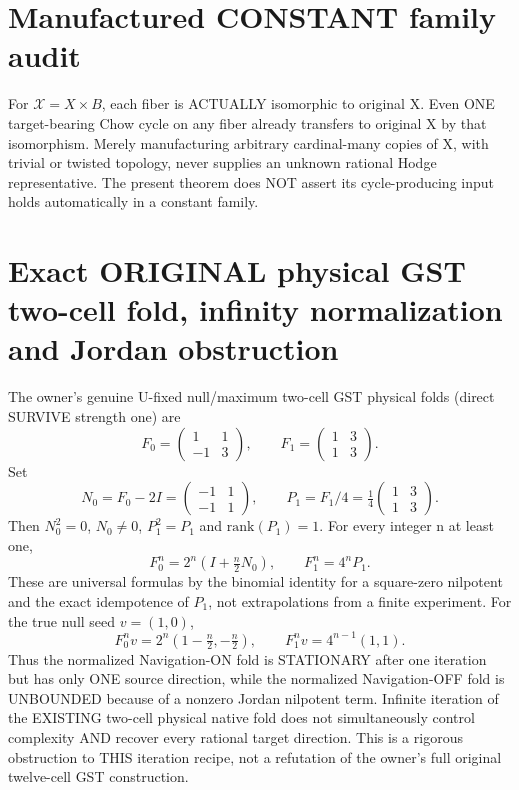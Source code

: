 \documentclass{article}
\begin{document}
\section{Manufactured CONSTANT family audit}
For $\mathcal X=X\times B$, each fiber is ACTUALLY isomorphic to original X.
Even ONE target-bearing Chow cycle on any fiber already transfers to original X by that isomorphism.
Merely manufacturing arbitrary cardinal-many copies of X, with trivial or twisted topology, never supplies an unknown rational Hodge representative.
The present theorem does NOT assert its cycle-producing input holds automatically in a constant family.

\section{Exact ORIGINAL physical GST two-cell fold, infinity normalization and Jordan obstruction}
The owner's genuine U-fixed null/maximum two-cell GST physical folds (direct SURVIVE strength one) are
\[
F_0=\begin{pmatrix}1&1\\-1&3\end{pmatrix},
\qquad
F_1=\begin{pmatrix}1&3\\1&3\end{pmatrix}.
\]
Set
\[
N_0=F_0-2I=\begin{pmatrix}-1&1\\-1&1\end{pmatrix},
\qquad
P_1=F_1/4=\tfrac14\begin{pmatrix}1&3\\1&3\end{pmatrix}.
\]
Then $N_0^2=0$, $N_0\neq0$, $P_1^2=P_1$ and $\mathrm{rank}(P_1)=1$.
For every integer n at least one,
\[
\boxed{F_0^n=2^n\left(I+\tfrac n2N_0\right),\qquad
F_1^n=4^nP_1.}
\]
These are universal formulas by the binomial identity for a square-zero nilpotent and the exact idempotence of $P_1$, not extrapolations from a finite experiment.
For the true null seed $v=(1,0)$,
\[
F_0^nv=2^n(1-\tfrac n2,-\tfrac n2),\qquad
F_1^nv=4^{n-1}(1,1).
\]
Thus the normalized Navigation-ON fold is STATIONARY after one iteration but has only ONE source direction, while the normalized Navigation-OFF fold is UNBOUNDED because of a nonzero Jordan nilpotent term.
Infinite iteration of the EXISTING two-cell physical native fold does not simultaneously control complexity AND recover every rational target direction.
This is a rigorous obstruction to THIS iteration recipe, not a refutation of the owner's full original twelve-cell GST construction.
\end{document}

